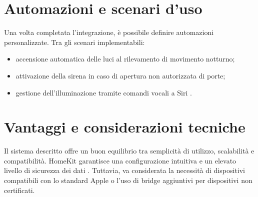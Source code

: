 \section{Automazioni e scenari d’uso}
Una volta completata l’integrazione, è possibile definire automazioni personalizzate. Tra gli scenari implementabili:
\begin{itemize}
    \item accensione automatica delle luci al rilevamento di movimento notturno;
    \item attivazione della sirena in caso di apertura non autorizzata di porte;
    \item gestione dell’illuminazione tramite comandi vocali a Siri \parencite{appleSiri}.
\end{itemize}

\section{Vantaggi e considerazioni tecniche}
Il sistema descritto offre un buon equilibrio tra semplicità di utilizzo, scalabilità e compatibilità. HomeKit garantisce una configurazione intuitiva e un elevato livello di sicurezza dei dati \parencite{applePrivacy}. Tuttavia, va considerata la necessità di dispositivi compatibili con lo standard Apple o l’uso di bridge aggiuntivi per dispositivi non certificati.


